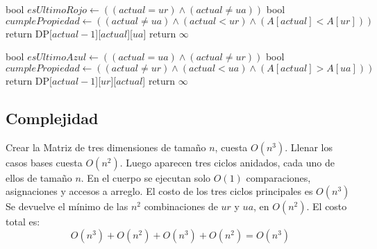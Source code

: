 \begin{algorithm}[H]
\begin{algorithmic}

    \State bool $esUltimoRojo \gets((actual = ur) \land (actual \neq ua))$ 
    \State bool $cumplePropiedad \gets((actual \neq ua) \land (actual < ur) \land (A[actual] < A[ur]))$  \\

        \State return DP[$actual-1$][$actual$][$ua$]
    \Else
        \State return $\infty$
    \EndIf
\EndProcedure
\end{algorithmic}
\end{algorithm}


\begin{algorithm}[H]
\begin{algorithmic}

    \State bool $esUltimoAzul \gets((actual = ua) \land (actual \neq ur))$ 
    \State bool $cumplePropiedad \gets((actual \neq ur) \land (actual < ua) \land (A[actual] > A[ua]))$  \\

        \State return DP[$actual-1$][$ur$][$actual$]
    \Else
        \State return $\infty$
    \EndIf
\EndProcedure
\end{algorithmic}
\end{algorithm}


\subsection{Complejidad}

Crear la Matriz de tres dimensiones de tamaño $n$, cuesta $O(n^3)$. Llenar los casos bases cuesta $O(n^2)$.
Luego aparecen tres ciclos anidados, cada uno de ellos de tamaño $n$. En el cuerpo se ejecutan solo $O(1)$ comparaciones, asignaciones y accesos a arreglo. El costo de los tres ciclos principales es $O(n^3)$ 
Se devuelve el mínimo de las $n^2$ combinaciones de $ur$ y $ua$, en $O(n^2)$. El costo total es: 
$$O(n^3) + O(n^2) + O(n^3) + O(n^2) = O(n^3)$$